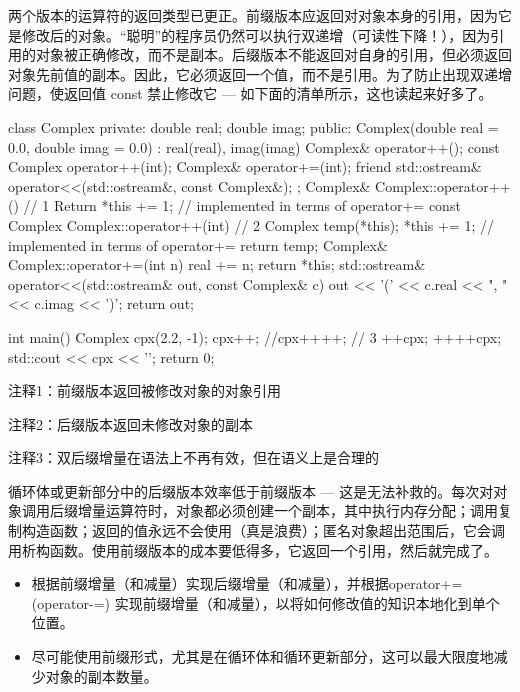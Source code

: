 两个版本的运算符的返回类型已更正。前缀版本应返回对对象本身的引用，因为它是修改后的对象。“聪明”的程序员仍然可以执行双递增（可读性下降！），因为引用的对象被正确修改，而不是副本。后缀版本不能返回对自身的引用，但必须返回对象先前值的副本。因此，它必须返回一个值，而不是引用。为了防止出现双递增问题，使返回值 const 禁止修改它 — 如下面的清单所示，这也读起来好多了。


\begin{cpp}
class Complex {
private:
  double real;
  double imag;
public:
  Complex(double real = 0.0, double imag = 0.0) : real(real), imag(imag) {}
  Complex& operator++();
  const Complex operator++(int);
  Complex& operator+=(int);
  friend std::ostream& operator<<(std::ostream&, const Complex&);
};
Complex& Complex::operator++() { // 1
  Return *this += 1; // implemented in terms of operator+=
}
const Complex Complex::operator++(int) { // 2
  Complex temp(*this);
  *this += 1; // implemented in terms of operator+=
  return temp;
}
Complex& Complex::operator+=(int n) {
  real += n;
  return *this;
}
std::ostream& operator<<(std::ostream& out, const Complex& c) {
  out << '(' << c.real << ", " << c.imag << ')';
  return out;
}

int main() {
  Complex cpx(2.2, -1);
  cpx++;
  //cpx++++; // 3
  ++cpx;
  ++++cpx;
  std::cout << cpx << '\n';
  return 0;
}
\end{cpp}

{\footnotesize
注释1：前缀版本返回被修改对象的对象引用

注释2：后缀版本返回未修改对象的副本

注释3：双后缀增量在语法上不再有效，但在语义上是合理的
}

循环体或更新部分中的后缀版本效率低于前缀版本 — 这是无法补救的。每次对对象调用后缀增量运算符时，对象都必须创建一个副本，其中执行内存分配；调用复制构造函数；返回的值永远不会使用（真是浪费）；匿名对象超出范围后，它会调用析构函数。使用前缀版本的成本要低得多，它返回一个引用，然后就完成了。


\begin{itemize}
\item
根据前缀增量（和减量）实现后缀增量（和减量），并根据operator+= (operator-=) 实现前缀增量（和减量），以将如何修改值的知识本地化到单个位置。

\item
尽可能使用前缀形式，尤其是在循环体和循环更新部分，这可以最大限度地减少对象的副本数量。
\end{itemize}







